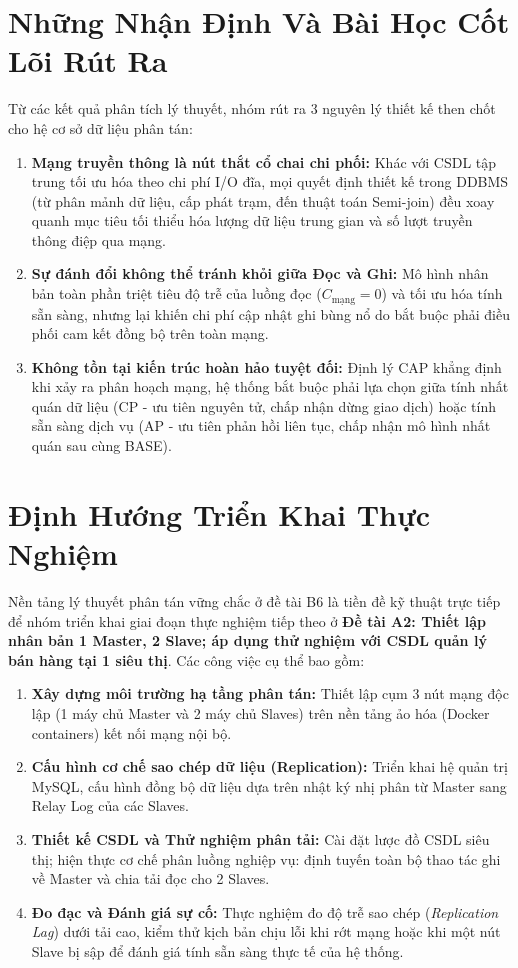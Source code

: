 \documentclass[12pt,a4paper]{report}
\begin{document}
\section{Những Nhận Định Và Bài Học Cốt Lõi Rút Ra}
Từ các kết quả phân tích lý thuyết, nhóm rút ra 3 nguyên lý thiết kế then chốt cho hệ cơ sở dữ liệu phân tán:
\begin{enumerate}[leftmargin=0.8cm, topsep=2pt, itemsep=2pt]
    \item \textbf{Mạng truyền thông là nút thắt cổ chai chi phối:} Khác với CSDL tập trung tối ưu hóa theo chi phí I/O đĩa, mọi quyết định thiết kế trong DDBMS (từ phân mảnh dữ liệu, cấp phát trạm, đến thuật toán Semi-join) đều xoay quanh mục tiêu tối thiểu hóa lượng dữ liệu trung gian và số lượt truyền thông điệp qua mạng.
    \item \textbf{Sự đánh đổi không thể tránh khỏi giữa Đọc và Ghi:} Mô hình nhân bản toàn phần triệt tiêu độ trễ của luồng đọc ($C_{\text{mạng}} = 0$) và tối ưu hóa tính sẵn sàng, nhưng lại khiến chi phí cập nhật ghi bùng nổ do bắt buộc phải điều phối cam kết đồng bộ trên toàn mạng.
    \item \textbf{Không tồn tại kiến trúc hoàn hảo tuyệt đối:} Định lý CAP khẳng định khi xảy ra phân hoạch mạng, hệ thống bắt buộc phải lựa chọn giữa tính nhất quán dữ liệu (CP - ưu tiên nguyên tử, chấp nhận dừng giao dịch) hoặc tính sẵn sàng dịch vụ (AP - ưu tiên phản hồi liên tục, chấp nhận mô hình nhất quán sau cùng BASE).
\end{enumerate}

\section{Định Hướng Triển Khai Thực Nghiệm}
Nền tảng lý thuyết phân tán vững chắc ở đề tài B6 là tiền đề kỹ thuật trực tiếp để nhóm triển khai giai đoạn thực nghiệm tiếp theo ở \textbf{Đề tài A2: Thiết lập nhân bản 1 Master, 2 Slave; áp dụng thử nghiệm với CSDL quản lý bán hàng tại 1 siêu thị}. Các công việc cụ thể bao gồm:

\begin{enumerate}[leftmargin=0.8cm, topsep=2pt, itemsep=2pt]
    \item \textbf{Xây dựng môi trường hạ tầng phân tán:} Thiết lập cụm 3 nút mạng độc lập (1 máy chủ Master và 2 máy chủ Slaves) trên nền tảng ảo hóa (Docker containers) kết nối mạng nội bộ.
    \item \textbf{Cấu hình cơ chế sao chép dữ liệu (Replication):} Triển khai hệ quản trị MySQL, cấu hình đồng bộ dữ liệu dựa trên nhật ký nhị phân từ Master sang Relay Log của các Slaves.
    \item \textbf{Thiết kế CSDL và Thử nghiệm phân tải:} Cài đặt lược đồ CSDL siêu thị; hiện thực cơ chế phân luồng nghiệp vụ: định tuyến toàn bộ thao tác ghi về Master và chia tải đọc cho 2 Slaves.
    \item \textbf{Đo đạc và Đánh giá sự cố:} Thực nghiệm đo độ trễ sao chép (\textit{Replication Lag}) dưới tải cao, kiểm thử kịch bản chịu lỗi khi rớt mạng hoặc khi một nút Slave bị sập để đánh giá tính sẵn sàng thực tế của hệ thống.
\end{enumerate}
\end{document}
